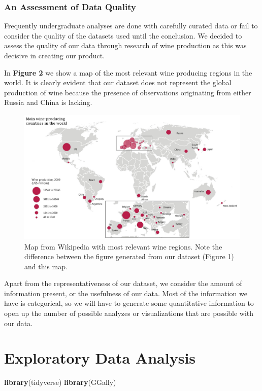 \documentclass[12pt,twoside]{amherstthesis}
\newenvironment{Shaded}{\begin{snugshade}}{\end{snugshade}}
\newcommand{\KeywordTok}[1]{\textcolor[rgb]{0.13,0.29,0.53}{\textbf{#1}}}
\newcommand{\NormalTok}[1]{#1}
\begin{document}
\subsection{An Assessment of Data
Quality}\label{an-assessment-of-data-quality}

Frequently undergraduate analyses are done with carefully curated data
or fail to consider the quality of the datasets used until the
conclusion. We decided to assess the quality of our data through
research of wine production as this was decisive in creating our
product.

In \textbf{Figure 2} we show a map of the most relevant wine producing
regions in the world. It is clearly evident that our dataset does not
represent the global production of wine because the presence of
observations originating from either Russia and China is lacking.
\begin{figure}[htbp]
\centering
\includegraphics[width=0.8\columnwidth]{../assets/winerieswikipedia.jpg}
\caption{Map from Wikipedia with most relevant wine regions. Note the difference between the figure generated from our dataset (Figure 1) and this map.}
\end{figure}
Apart from the representativeness of our dataset, we consider the amount
of information present, or the usefulness of our data. Most of the
information we have is categorical, so we will have to generate some
quantitative information to open up the number of possible analyzes or
visualizations that are possible with our data.

\chapter{Exploratory Data Analysis}\label{rmd-basics}
\begin{Shaded}
\begin{Highlighting}[]
\KeywordTok{library}\NormalTok{(tidyverse)}
\KeywordTok{library}\NormalTok{(GGally)}
\end{Highlighting}
\end{Shaded}
\end{document}
